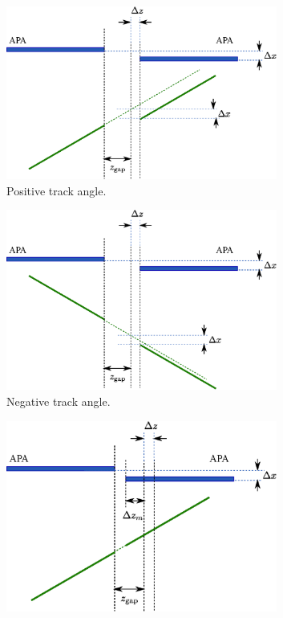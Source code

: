 \begin{figure}[p]
  \centering
  \begin{subfigure}[t]{0.48\linewidth}
    \centering
    \includegraphics[width=0.98\textwidth]{apa_gap_xoffset_zoffset_pos.eps}
    \caption{Positive track angle.}
    \label{fig:APAGapXOffsetZOffsetPos}
  \end{subfigure}
  \hfill
  \begin{subfigure}[t]{0.48\linewidth}
    \centering
    \includegraphics[width=0.98\textwidth]{apa_gap_xoffset_zoffset_neg.eps}
    \caption{Negative track angle.}
    \label{fig:APAGapXOffsetZOffsetNeg}
  \end{subfigure}
  \vfill
  \begin{subfigure}[t]{0.48\linewidth}
    \centering
    \includegraphics[width=0.98\textwidth]{apa_gap_xoffset_zoffset_pos_fix.eps}

\end{subfigure}
\end{figure}
